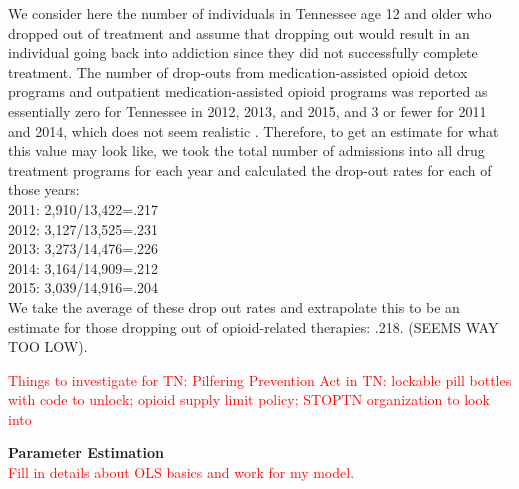 \documentclass[12pt]{article}
\begin{document}
\begin{itemize}
We consider here the number of individuals in Tennessee age 12 and older who dropped out of treatment and assume that dropping out would result in an individual going back into addiction since they did not successfully complete treatment. The number of drop-outs from medication-assisted opioid detox programs and outpatient medication-assisted opioid programs was reported as essentially zero for Tennessee in 2012, 2013, and 2015, and 3 or fewer for 2011 and 2014, which does not seem realistic \cite{TEDS2011_SAMSHA_discharges, TEDS2012_SAMSHA_discharges, TEDS2013_SAMSHA_discharges, TEDS2014_SAMSHA_discharges, TEDS2015_SAMSHA_discharges}. Therefore, to get an estimate for what this value may look like, we took the total number of admissions into all drug treatment programs for each year and calculated the drop-out rates for each of those years: \\
2011: 2,910/13,422=.217  \cite{TEDS2011_SAMSHA_admissions,TEDS2011_SAMSHA_discharges} \\
2012: 3,127/13,525=.231 \cite{TEDS2012_SAMSHA_admissions, TEDS2012_SAMSHA_discharges} \\
2013: 3,273/14,476=.226 \cite{TEDS2013_SAMSHA_admissions, TEDS2013_SAMSHA_discharges} \\
2014: 3,164/14,909=.212  \cite{TEDS2014_SAMSHA_admissions, TEDS2014_SAMSHA_discharges} \\
2015:  3,039/14,916=.204 \cite{TEDS2015_SAMSHA_admissions, TEDS2015_SAMSHA_discharges} \\

We take the average of these drop out rates and extrapolate this to be an estimate for those dropping out of opioid-related therapies: .218. (SEEMS WAY TOO LOW).



\end{itemize}


\textcolor{red}{Things to investigate for TN: Pilfering Prevention Act in TN: lockable pill bottles with code to unlock; opioid supply limit policy; STOPTN organization to look into} 





\textbf{Parameter Estimation} \\
\textcolor{red}{Fill in details about OLS basics and work for my model.}
\end{document}
